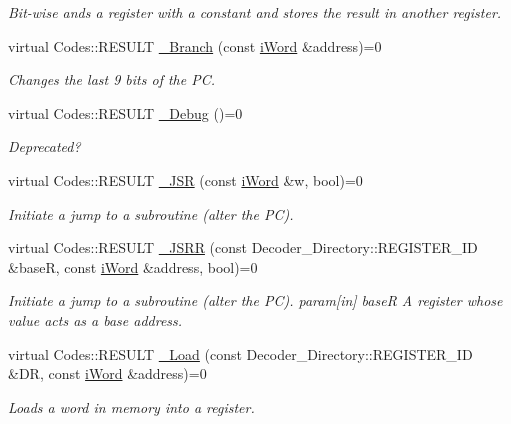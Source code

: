 \begin{DoxyCompactItemize}
\begin{DoxyCompactList}\small\item\em Bit-\/wise ands a register with a constant and stores the result in another register. \item\end{DoxyCompactList}\item 
virtual Codes::RESULT \hyperlink{classiWi11_a42d2c50609424634873413d7a6614397}{\_\-Branch} (const \hyperlink{classiWord}{iWord} \&address)=0
\begin{DoxyCompactList}\small\item\em Changes the last 9 bits of the PC. \item\end{DoxyCompactList}\item 
virtual Codes::RESULT \hyperlink{classiWi11_ae510f127a0c3b87d42cdbe5b14204a65}{\_\-Debug} ()=0
\begin{DoxyCompactList}\small\item\em Deprecated? \item\end{DoxyCompactList}\item 
virtual Codes::RESULT \hyperlink{classiWi11_a44e0e3fef9c35401b5a026fb448e872c}{\_\-JSR} (const \hyperlink{classiWord}{iWord} \&w, bool)=0
\begin{DoxyCompactList}\small\item\em Initiate a jump to a subroutine (alter the PC). \item\end{DoxyCompactList}\item 
virtual Codes::RESULT \hyperlink{classiWi11_ac8fece98ceab4592a5761e6917b5b7a2}{\_\-JSRR} (const Decoder\_\-Directory::REGISTER\_\-ID \&baseR, const \hyperlink{classiWord}{iWord} \&address, bool)=0
\begin{DoxyCompactList}\small\item\em Initiate a jump to a subroutine (alter the PC). param\mbox{[}in\mbox{]} baseR A register whose value acts as a base address. \item\end{DoxyCompactList}\item 
virtual Codes::RESULT \hyperlink{classiWi11_a8dac5a6aca2f4c6b398d9a0c44297226}{\_\-Load} (const Decoder\_\-Directory::REGISTER\_\-ID \&DR, const \hyperlink{classiWord}{iWord} \&address)=0
\begin{DoxyCompactList}\small\item\em Loads a word in memory into a register. \item\end{DoxyCompactList}\item 

\end{DoxyCompactItemize}
